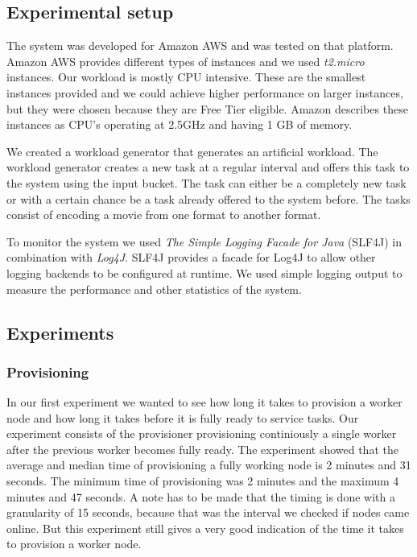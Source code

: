 \documentclass[a4paper]{IEEEtran}
\begin{document}
\subsection{Experimental setup}
The system was developed for Amazon AWS and was tested on that platform.
Amazon AWS provides different types of instances and we used \emph{t2.micro} instances.
Our workload is mostly CPU intensive.
These are the smallest instances provided and we could achieve higher performance on larger instances,
 but they were chosen because they are Free Tier eligible.
Amazon describes these instances as CPU's operating at 2.5GHz and having 1 GB of memory.

We created a workload generator that generates an artificial workload.
The workload generator creates a new task at a regular interval and offers this task to the system using the input bucket.
The task can either be a completely new task or with a certain chance be a task already offered to the system before.
The tasks consist of encoding a movie from one format to another format.

To monitor the system we used \emph{The Simple Logging Facade for Java} (SLF4J) in combination with \emph{Log4J}.
SLF4J provides a facade for Log4J to allow other logging backends to be configured at runtime.
We used simple logging output to measure the performance and other statistics of the system.

\subsection{Experiments}
\subsubsection{Provisioning}
In our first experiment we wanted to see how long it takes to provision a worker node and how long it takes before it is fully ready to service tasks.
Our experiment consists of the provisioner provisioning continiously a single worker after the previous worker becomes fully ready.
The experiment showed that the average and median time of provisioning a fully working node is 2 minutes and 31 seconds.
The minimum time of provisioning was 2 minutes and the maximum 4 minutes and 47 seconds.
A note has to be made that the timing is done with a granularity of 15 seconds, because that was the interval we checked if nodes came online.
But this experiment still gives a very good indication of the time it takes to provision a worker node.
\end{document}
